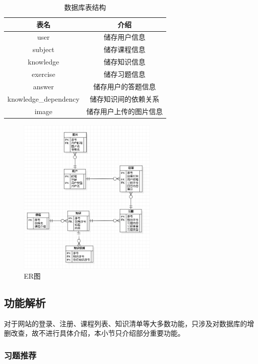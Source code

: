 \documentclass{nwafucoursepaper}
\begin{document}
\begin{table}[htp]
  \centering
  \begin{tabular}{|c|c|}
  \hline
  表名                    & 介绍          \\ \hline
  user                  & 储存用户信息      \\ \hline
  subject               & 储存课程信息      \\ \hline
  knowledge             & 储存知识信息      \\ \hline
  exercise              & 储存习题信息      \\ \hline
  answer                & 储存用户的答题信息   \\ \hline
  knowledge\_dependency & 储存知识间的依赖关系  \\ \hline
  image                 & 储存用户上传的图片信息 \\ \hline
  \end{tabular}
  \caption{数据库表结构}
  \label{tables}
  \end{table}

\begin{figure}[htp]
  \centering
  \includegraphics[width=0.6\textwidth]{ERD.png}
  \caption{ER图}
  \label{ERD}
\end{figure}

\subsection{功能解析}

对于网站的登录、注册、课程列表、知识清单等大多数功能，只涉及对数据库的增删改查，故不进行具体介绍，本小节只介绍部分重要功能。

\subsubsection{习题推荐}
\end{document}

